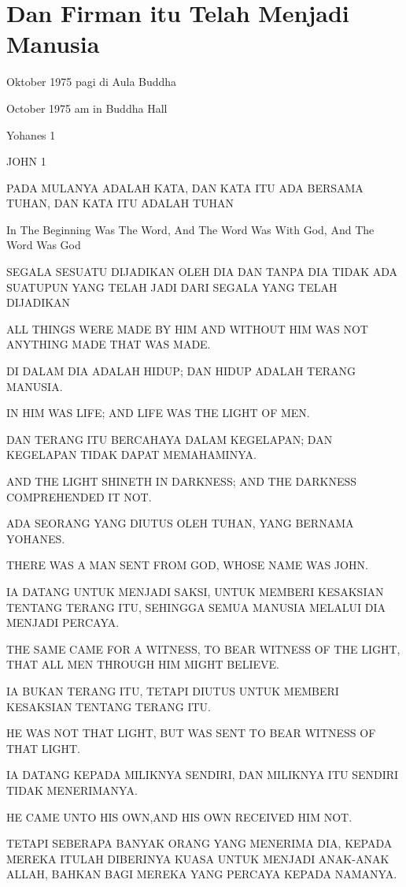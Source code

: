\chapter{Dan Firman itu Telah Menjadi Manusia}

 Oktober 1975 pagi di Aula Buddha

 October 1975 am in Buddha Hall

\bahasa
Yohanes 1

\english
JOHN 1

 PADA MULANYA ADALAH KATA, DAN KATA ITU ADA BERSAMA TUHAN, DAN KATA ITU ADALAH TUHAN

 In The Beginning Was The Word, And The Word Was With God, And The Word Was God

 SEGALA SESUATU DIJADIKAN OLEH DIA DAN TANPA DIA TIDAK ADA SUATUPUN YANG TELAH JADI DARI SEGALA YANG TELAH DIJADIKAN

 ALL THINGS WERE MADE BY HIM AND WITHOUT HIM WAS NOT ANYTHING MADE THAT WAS MADE.

 DI DALAM DIA ADALAH HIDUP; DAN HIDUP ADALAH TERANG MANUSIA.

 IN HIM WAS LIFE; AND LIFE WAS THE LIGHT OF MEN.

 DAN TERANG ITU BERCAHAYA DALAM KEGELAPAN; DAN KEGELAPAN TIDAK DAPAT MEMAHAMINYA.

 AND THE LIGHT SHINETH IN DARKNESS; AND THE DARKNESS COMPREHENDED IT NOT.

 ADA SEORANG YANG DIUTUS OLEH TUHAN, YANG BERNAMA YOHANES.

 THERE WAS A MAN SENT FROM GOD, WHOSE NAME WAS JOHN.

 IA DATANG UNTUK MENJADI SAKSI, UNTUK MEMBERI KESAKSIAN TENTANG TERANG ITU, SEHINGGA SEMUA MANUSIA MELALUI DIA MENJADI PERCAYA.

 THE SAME CAME FOR A WITNESS, TO BEAR WITNESS OF THE LIGHT, THAT ALL MEN THROUGH HIM MIGHT BELIEVE.

 IA BUKAN TERANG ITU, TETAPI DIUTUS UNTUK MEMBERI KESAKSIAN TENTANG TERANG ITU.

 HE WAS NOT THAT LIGHT, BUT WAS SENT TO BEAR WITNESS OF THAT LIGHT.

 IA DATANG KEPADA MILIKNYA SENDIRI, DAN MILIKNYA ITU SENDIRI TIDAK MENERIMANYA.

 HE CAME UNTO HIS OWN,AND HIS OWN RECEIVED HIM NOT.

 TETAPI SEBERAPA BANYAK ORANG YANG MENERIMA DIA, KEPADA MEREKA ITULAH DIBERINYA KUASA UNTUK MENJADI ANAK-ANAK ALLAH, BAHKAN BAGI MEREKA YANG PERCAYA KEPADA NAMANYA.

